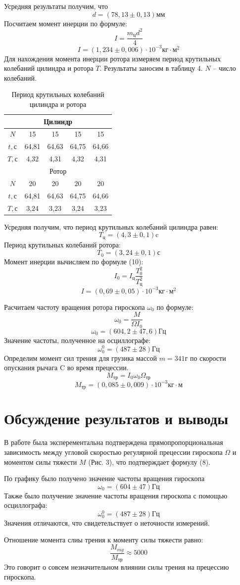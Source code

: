 \documentclass[a4paper,12pt]{article} %
\begin{document}
Усредняя результаты получим, что
\[d = (78,13\pm0,13)\text{мм}\]
Посчитаем момент инерции по формуле:
\[I = \frac{m_\text{ц}d^2}{4}\]
\[I = (1,234\pm0,006)\cdot 10^{-3}\text{кг}\cdot \text{м}^2\]
Для нахождения момента инерции ротора измеряем период крутильных колебаний цилиндра и ротора $T$. Результаты заносим в таблицу 4. $N$ -- число колебаний. 
\begin{table}[h]
\centering
\begin{tabular}{|c|c|c|c|c|}
\hline
\multicolumn{5}{|c|}{Цилиндр}     \\ \hline
$N$ & 15    & 15    & 15    & 15    \\ \hline
$t, \text{с}$ & 64,81 & 64,63 & 64,75 & 64,66 \\ \hline
$T, \text{с}$ & 4,32  & 4,31  & 4,32  & 4,31  \\ \hline
\multicolumn{5}{|c|}{Ротор}       \\ \hline
$N$ & 20    & 20    & 20    & 20    \\ \hline
$t, \text{с}$ & 64,81 & 64,63 & 64,75 & 64,66 \\ \hline
$T, \text{с}$ & 3,24  & 3,23  & 3,24  & 3,23  \\ \hline
\end{tabular}
\caption{Период крутильных колебаний цилиндра и ротора}
\end{table}
Усредняя получим, что период крутильных колебаний цилиндра равен:
\[T_\text{ц} = (4,3\pm0,1)\text{c}\]
Период крутильных колебаний ротора:
\[T_0 = (3,24\pm0,1)\text{с}\]
Момент инерции вычисляем по формуле (10):
\[I_0 = I_\text{ц}\frac{T_0^2}{T_{\text{ц}}^2}\]
\[I = (0,69\pm0,05)\cdot 10^{-3}\text{кг}\cdot \text{м}^2\]

Расчитаем частоту вращения ротора гироскопа $\omega_0$ по формуле:
\[\omega_0 = \frac{M}{\Omega I_0}\]
\[\omega_0 = (604,2\pm47,6)\text{Гц}\]
Значение частоты, полученное на осциллографе:
\[\omega_0^0 = (487\pm28)\text{Гц}\]
Определим момент сил трения для грузика массой $m = 341\text{г}$ по скорости опускания рычага $\text{C}$ во время прецессии.
\[M_\text{тр} = I_0\omega_0\Omega_\text{тр}\]
\[M_\text{тр} = (0,085\pm0,009)\cdot 10^{-3}\text{кг}\cdot \text{м}\]
\section{Обсуждение результатов и выводы}
В работе была эксперементальна подтверждена прямопропорциональная зависимость между угловой скоростью регулярной прецессии гироскопа $\Omega$ и моментом силы тяжести $M$ (Рис. 3), что подтверждает формулу (8).

По графику было получено значение частоты вращения гироскопа
\[\omega_0 = (604\pm47)\text{Гц}\]
Также было получение значение частоты вращения гироскопа с помощью осциллографа:
\[\omega_0^0 = (487\pm28)\text{Гц}\]
Значения отличаются, что свидетельствует о неточности измерений.

Отношение момента слиы трения к моменту силы тяжести равно:
\[\frac{M_{mg}}{M_\text{тр}} \approx 5000\]
Это говорит о совсем незначительном влиянии силы трения на прецессию гироскопа.
\end{document}

